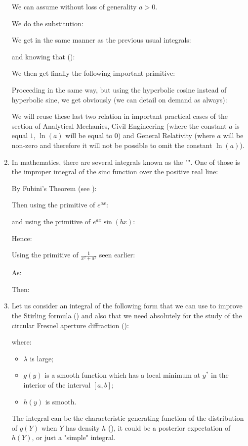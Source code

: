\begin{enumerate}
		We can assume without loss of generality $a>0$.
		
		We do the substitution:
		
		We get in the same manner as the previous usual integrals:
		
		and knowing that ():
		
		We then get finally the following important primitive:
		
		Proceeding in the same way, but using the hyperbolic cosine instead of hyperbolic sine, we get obviously (we can detail on demand as always):
		
		We will reuse these last two relation in important practical cases of the section of Analytical Mechanics, Civil Engineering (where the constant $a$ is equal $1$, $\ln(a)$ will be equal to $0$) and General Relativity (where $a$ will be non-zero and therefore it will not be possible to omit the constant $\ln(a)$).
		
		\item In mathematics, there are several integrals known as the "\label{Dirichlet integral}". One of those is the improper integral of the sinc function over the positive real line:
	
	By Fubini's Theorem (see \pageref{fubini theorem}):
	
	Then using the primitive of $e^{ax}$:
	
	and using the primitive of $e^{ax}\sin(bx)$:
	
	Hence:

	Using the primitive of $\frac{1}{x^2+a^2}$ seen earlier:
	
	As:
	
	Then:
	
		
		\item Let us consider an integral of the following form that we can use to improve the Stirling formula () and also that we need absolutely for the study of the circular Fresnel aperture diffraction ():
		
		where:
		\begin{itemize}
			\item $\lambda$ is large;
			\item $g(y)$ is a smooth function which has a local minimum at $y^*$ in the interior of the interval $[a, b]$;
			\item $h(y)$ is smooth.
		\end{itemize}
		The integral can be the characteristic generating function of the distribution of $g(Y)$ when $Y$ has density $h$ (), it could be a posterior expectation of $h(Y)$, or just a "simple" integral.
		

\end{enumerate}
